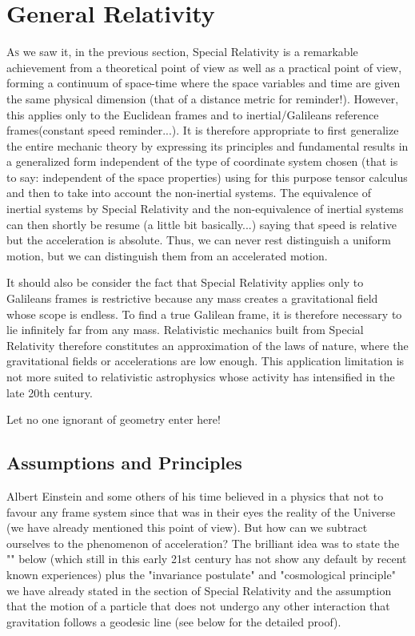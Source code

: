 	\section{General Relativity}\label{general relativity}
	\lettrine[lines=4]{\color{BrickRed}A}s we saw it, in the previous section, Special Relativity is a remarkable achievement from a theoretical point of view as well as a practical point of view, forming a continuum of space-time where the space variables and time are given the same physical dimension (that of a distance metric for reminder!). However, this applies only to the Euclidean frames and to inertial/Galileans reference frames(constant speed reminder...). It is therefore appropriate to first generalize the entire mechanic theory by expressing its principles and fundamental results in a generalized form independent of the type of coordinate system chosen (that is to say: independent of the space properties) using for this purpose tensor calculus and then to take into account the non-inertial systems. The equivalence of inertial systems by Special Relativity and the non-equivalence of inertial systems can then shortly be resume (a little bit basically...) saying that speed is relative but the acceleration is absolute. Thus, we can never rest distinguish a uniform motion, but we can distinguish them from an accelerated motion.
	
	It should also be consider the fact that Special Relativity applies only to Galileans frames is restrictive because any mass creates a gravitational field whose scope is endless. To find a true Galilean frame, it is therefore necessary to lie infinitely far from any mass. Relativistic mechanics built from Special Relativity therefore constitutes an approximation of the laws of nature, where the gravitational fields or accelerations are low enough. This application limitation is not  more suited to relativistic astrophysics whose activity has intensified in the late 20th century.
	\begin{fquote}[Plato]Let no one ignorant of geometry enter here!
 	\end{fquote}
	\subsection{Assumptions and Principles}
	Albert Einstein and some others of his time believed in a physics that not to favour any frame system since that was in their eyes the reality of the Universe (we have already mentioned this point of view). But how can we subtract ourselves to the phenomenon of  acceleration? The brilliant idea was to state the "" below (which still in this early 21st century has not show any default by recent known experiences) plus the "invariance postulate" and "cosmological principle" we have already stated in the section of Special Relativity and the assumption that the motion of a particle that does not undergo any other interaction that gravitation follows a geodesic line (see below for the detailed proof).
	
